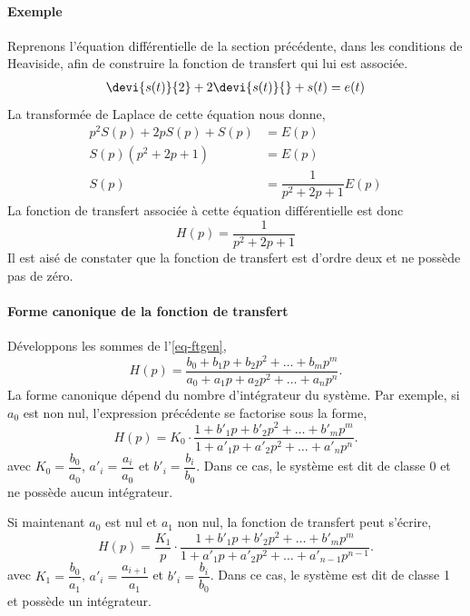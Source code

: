\paragraph{Exemple}
Reprenons l'équation différentielle de la section précédente, dans 
les conditions de Heaviside, afin de construire la fonction de 
transfert qui lui est associée. 
\begin{align}
\devi{s(t)}{2}+2\devi{s(t)}{} + s(t) = e(t)
\end{align}
La transformée de Laplace de cette équation nous donne,
\begin{align*}
	p^2S(p)+2pS(p)+S(p)&=E(p)\\
	S(p)\left(p^2+2p+1\right)&=E(p)\\
	S(p)&=\dfrac{1}{p^2+2p+1}E(p)
\end{align*}
La fonction de transfert associée à cette équation différentielle est donc 
\[
    H(p)=\dfrac{1}{p^2+2p+1}
\]
Il est aisé de constater que la fonction de transfert est d'ordre deux 
et ne possède pas de zéro.


\paragraph{Forme canonique de la fonction de transfert}
Développons les sommes de l'\cref{eq-ftgen},
\[
    H(p)=\dfrac{b_0+b_1p+b_2p^2+\ldots+b_mp^m}{a_0+a_1p+a_2p^2+\ldots+a_np^n}.
\]
La forme canonique dépend du nombre d'intégrateur du système. 
Par exemple, si $a_0$ est non nul, l'expression précédente se factorise 
sous la forme,
\[
    H(p)=K_0\cdot\dfrac{1+b'_1p+b'_2p^2+\ldots+b'_mp^m}
                       {1+a'_1p+a'_2p^2+\ldots+a'_np^n}.
\]
avec $K_0=\dfrac{b_0}{a_0}$, $a'_i=\dfrac{a_i}{a_0}$ et 
$b'_i=\dfrac{b_i}{b_0}$. Dans ce cas, le système est dit de 
classe 0 et ne possède aucun intégrateur.

Si maintenant $a_0$ est nul et $a_1$ non nul, la fonction de transfert 
peut s'écrire,
\[
    H(p)=\dfrac{K_1}{p}
    \cdot
    \dfrac{1+b'_1p+b'_2p^2+\ldots+b'_mp^m}
          {1+a'_1p+a'_2p^2+\ldots+a'_{n-1}p^{n-1}}.
\]
avec $K_1=\dfrac{b_0}{a_1}$, $a'_i=\dfrac{a_{i+1}}{a_1}$ et 
$b'_i=\dfrac{b_i}{b_0}$. Dans ce cas, le système est dit de classe 1 
et possède un intégrateur.

